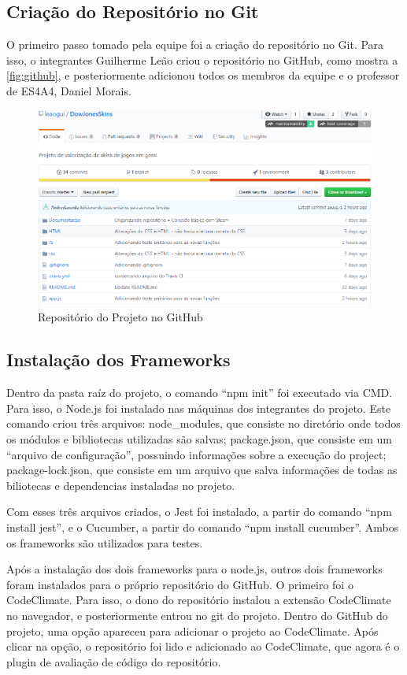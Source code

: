 \subsection{Criação do Repositório no Git}
O primeiro passo tomado pela equipe foi a criação do repositório no Git. Para isso, o integrantes
Guilherme Leão criou o repositório no GitHub, como mostra a \autoref{fig:github}, e posteriormente adicionou todos os membros
da equipe e o professor de ES4A4, Daniel Morais.\\
\begin{figure}[!htb]
	\centering
	\includegraphics[scale=0.6]{Imagens/Repositorio.png}
	\caption{Repositório do Projeto no GitHub}
	\label{fig:github}
\end{figure}

\subsection{Instalação dos Frameworks}
Dentro da pasta raíz do projeto, o comando ``npm init'' foi executado via CMD. Para isso, o Node.js foi instalado
nas máquinas dos integrantes do projeto. Este comando criou três arquivos: node\_modules, que consiste no diretório onde todos
os módulos e bibliotecas utilizadas são salvas; package.json, que consiste em um ``arquivo de configuração'',
possuindo informações sobre a execução do project; package-lock.json, que consiste em um arquivo que salva
informações de todas as biliotecas e dependencias instaladas no projeto.

Com esses três arquivos criados, o Jest foi instalado, a partir do comando ``npm install jest'', e o Cucumber, a partir
do comando ``npm install cucumber''. Ambos os frameworks são utilizados para testes.

Após a instalação dos dois frameworks para o node.js, outros dois frameworks foram instalados para o próprio repositório do GitHub.
O primeiro foi o CodeClimate. Para isso, o dono do repositório instalou a extensão CodeClimate no navegador,
e posteriormente entrou no git do projeto. Dentro do GitHub do projeto, uma opção apareceu para adicionar
o projeto ao CodeClimate. Após clicar na opção, o repositório foi lido e adicionado ao CodeClimate, 
que agora é o plugin de avaliação de código do repositório.


